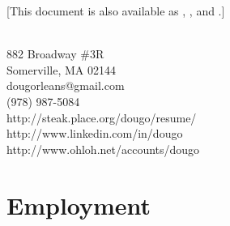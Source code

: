 \documentclass{article}
\begin{document}
\def\TZPtitle{Doug Orleans}

\htmlonly
{\small [This document is also available as ,
, and .]}
\endhtmlonly

\begin{center}
{} \\
{\large 882 Broadway \#3R \\ Somerville, MA 02144} \\
dougorleans@gmail.com \\
(978) 987-5084
\texonly \small
\\ http://steak.place.org/dougo/resume/
\\ http://www.linkedin.com/in/dougo
\\ http://www.ohloh.net/accounts/dougo
\endtexonly
\htmlonly
\\ 
\endhtmlonly
\end{center}

\section*{Employment}
\end{document}
